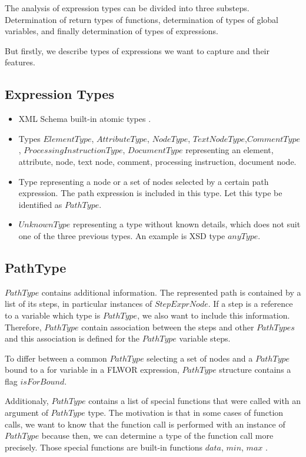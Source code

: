 The analysis of expression types can be divided into three substeps. Determination of return types of functions, determination of types of global variables, and finally determination of types of expressions.

But firstly, we describe types of expressions we want to capture and their features.

\subsection{Expression Types}

\begin{itemize}
\item XML Schema built-in atomic types .
\item Types $ElementType$, $AttributeType$, $NodeType$, $TextNodeType$,\linebreak $CommentType$, $ProcessingInstructionType$, $DocumentType$ representing an element, attribute, node, text node, comment, processing instruction, document node.
\item Type representing a node or a set of nodes selected by a certain path expression. The path expression is included in this type. Let this type be identified as $PathType$.
\item $UnknownType$ representing a type without known details, which does not suit one of the three previous types. An example is XSD type $anyType$.
\end{itemize}

\subsection{PathType}
$PathType$ contains additional information. The represented path is contained by a list of its steps, in particular instances of $StepExprNode$. If a step is a reference to a variable which type is $PathType$, we also want to include this information. Therefore, $PathType$ contain association between the steps and other $PathTypes$ and this association is defined for the $PathType$ variable steps.

To differ between a common $PathType$ selecting a set of nodes and a $PathType$ bound to a for variable in a FLWOR expression, $PathType$ structure contains a flag $isForBound$.

Additionaly, $PathType$ contains a list of special functions that were called with an argument of $PathType$ type. The motivation is that in some cases of function calls, we want to know that the function call is performed with an instance of $PathType$ because then, we can determine a type of the function call more precisely. Those special functions are built-in functions $data$, $min$, $max$ .

